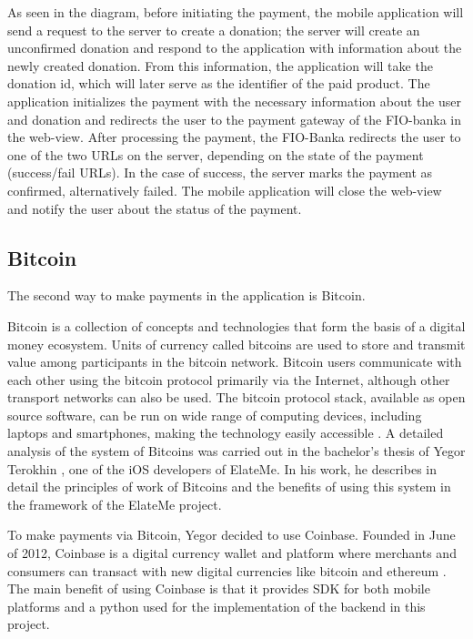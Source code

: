 
As seen in the diagram, before initiating the payment, the mobile application will send a request to the server to create a donation; the server will create an unconfirmed donation and respond to the application with information about the newly created donation. From this information, the application will take the donation id, which will later serve as the identifier of the paid product. The application initializes the payment with the necessary information about the user and donation and redirects the user to the payment gateway of the FIO-banka in the web-view. After processing the payment, the FIO-Banka redirects the user to one of the two URLs on the server, depending on the state of the payment (success/fail URLs). In the case of success, the server marks the payment as confirmed, alternatively failed. The mobile application will close the web-view and notify the user about the status of the payment.

\subsection{Bitcoin}
The second way to make payments in the application is Bitcoin.

Bitcoin is a collection of concepts and technologies that form the basis of a digital money ecosystem. Units of currency called bitcoins are used to store and transmit value among participants in the bitcoin network. Bitcoin users communicate with each other using the bitcoin protocol primarily via the Internet, although other transport networks can also be used. The bitcoin protocol stack, available as open source software, can be run on wide range of computing devices, including laptops and smartphones, making the technology easily accessible \cite{bitcoin}. A detailed analysis of the system of Bitcoins was carried out in the bachelor's thesis of Yegor Terokhin \cite{ios1}, one of the iOS developers of ElateMe. In his work, he describes in detail the principles of work of Bitcoins and the benefits of using this system in the framework of the ElateMe project.

To make payments via Bitcoin, Yegor decided to use Coinbase. Founded in June of 2012, Coinbase is a digital currency wallet and platform where merchants and consumers can transact with new digital currencies like bitcoin and ethereum \cite{coinbase}. The main benefit of using Coinbase is that it provides \ac{SDK} for both mobile platforms and a python used for the implementation of the backend in this project.

